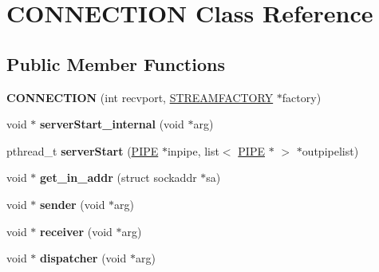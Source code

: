 \hypertarget{classCONNECTION}{}\section{C\+O\+N\+N\+E\+C\+T\+I\+O\+N Class Reference}
\label{classCONNECTION}
\subsection*{Public Member Functions}
\begin{DoxyCompactItemize}
\item 
\hypertarget{classCONNECTION_a5125726f68f007997156b67a9617b5cf}{}{\bfseries C\+O\+N\+N\+E\+C\+T\+I\+O\+N} (int recvport, \hyperlink{classSTREAMFACTORY}{S\+T\+R\+E\+A\+M\+F\+A\+C\+T\+O\+R\+Y} $\ast$factory)\label{classCONNECTION_a5125726f68f007997156b67a9617b5cf}

\item 
\hypertarget{classCONNECTION_a7ff7ccbd788bd5f7a47ba99530abf3e0}{}void $\ast$ {\bfseries server\+Start\+\_\+internal} (void $\ast$arg)\label{classCONNECTION_a7ff7ccbd788bd5f7a47ba99530abf3e0}

\item 
\hypertarget{classCONNECTION_af2740d50366fca10381c135a09785dd8}{}pthread\+\_\+t {\bfseries server\+Start} (\hyperlink{classPIPE}{P\+I\+P\+E} $\ast$inpipe, list$<$ \hyperlink{classPIPE}{P\+I\+P\+E} $\ast$ $>$ $\ast$outpipelist)\label{classCONNECTION_af2740d50366fca10381c135a09785dd8}

\item 
\hypertarget{classCONNECTION_a43239ade276d44c0a626fe8c4df37a61}{}void $\ast$ {\bfseries get\+\_\+in\+\_\+addr} (struct sockaddr $\ast$sa)\label{classCONNECTION_a43239ade276d44c0a626fe8c4df37a61}

\item 
\hypertarget{classCONNECTION_ab3a8e718ce95d1df393ab7a0ceca0c94}{}void $\ast$ {\bfseries sender} (void $\ast$arg)\label{classCONNECTION_ab3a8e718ce95d1df393ab7a0ceca0c94}

\item 
\hypertarget{classCONNECTION_ab164678ba891b7e205027561677fff52}{}void $\ast$ {\bfseries receiver} (void $\ast$arg)\label{classCONNECTION_ab164678ba891b7e205027561677fff52}

\item 
\hypertarget{classCONNECTION_af515385d3584b6ff051a1c6d33493509}{}void $\ast$ {\bfseries dispatcher} (void $\ast$arg)\label{classCONNECTION_af515385d3584b6ff051a1c6d33493509}


\end{DoxyCompactItemize}
